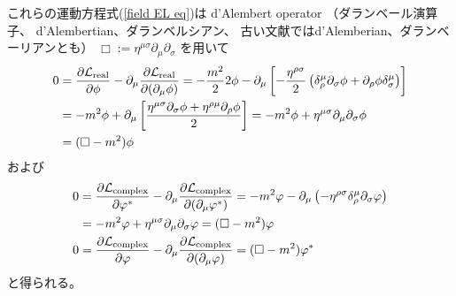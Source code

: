 これらの運動方程式(\ref{field EL eq})は
d'Alembert operator
（ダランベール演算子、
d'Alembertian、ダランベルシアン、
古い文献ではd'Alemberian、ダランベーリアンとも）
$\Box := \eta^{\mu \sigma}
    \partial_\mu
    \partial_\sigma$
を用いて
\begin{align}
    0 &=
    \dfrac{\partial \mathcal{L}_{\rm real}}
        {\partial \phi}
    -
    \partial_\mu
    \dfrac{\partial \mathcal{L}_{\rm real}}
        {\partial (\partial_\mu \phi)}
    =
    - \dfrac{m^2}{2}2 \phi
    -
    \partial_\mu
    \left[
        -
        \dfrac{ \eta^{\rho \sigma} }{2}
        \left(
            \delta_\rho^\mu
            \partial_\sigma \phi
        +
            \partial_\rho \phi
            \delta_\sigma^\mu
        \right)
    \right]
\notag\\&
    =
    - m^2 \phi
    +
    \partial_\mu
    \left[
        \dfrac{
            \eta^{\mu \sigma}
            \partial_\sigma \phi
        +
            \eta^{\rho \mu}
            \partial_\rho \phi
        }{2}
    \right]
    =
    - m^2 \phi
    +
    \eta^{\mu \sigma}
        \partial_\mu
        \partial_\sigma
    \phi
\notag\\&
    =
    (\Box - m^2) \phi
\label{free real scalar eom}
\end{align}
および
\begin{subequations}
\begin{align}
    0 &=
    \dfrac{\partial \mathcal{L}_{\rm complex}}
        {\partial \varphi^*}
    -
    \partial_\mu
    \dfrac{\partial \mathcal{L}_{\rm complex}}
        {\partial (\partial_\mu \varphi^*)}
    =
    -
    m^2 \varphi
    -
    \partial_\mu
    \left(
        -
        \eta^{\rho\sigma}
        \delta_\rho^\mu
        \partial_\sigma \varphi        
    \right)
\notag\\&
    =
    -
    m^2 \varphi
    +
    \eta^{\mu\sigma}
        \partial_\mu
        \partial_\sigma
        \varphi
    =
    (\Box - m^2)
    \varphi
\\
    0 &=
    \dfrac{\partial \mathcal{L}_{\rm complex}}
        {\partial \varphi}
    -
    \partial_\mu
    \dfrac{\partial \mathcal{L}_{\rm complex}}
        {\partial (\partial_\mu \varphi)}
    =
    (\Box - m^2)
    \varphi^*
\end{align}
\label{free complex scalar eom}
\end{subequations}
と得られる。

